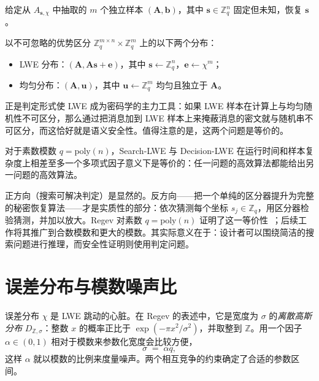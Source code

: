 \begin{definition}
给定从 $A_{\mathbf{s},\chi}$ 中抽取的 $m$ 个独立样本 $(\mathbf{A},\mathbf{b})$，其中 $\mathbf{s}\in\mathbb{Z}_q^{n}$ 固定但未知，恢复 $\mathbf{s}$。
\end{definition}

\begin{definition}
以不可忽略的优势区分 $\mathbb{Z}_q^{m\times n}\times\mathbb{Z}_q^{m}$ 上的以下两个分布：
\begin{itemize}
  \item LWE 分布：$(\mathbf{A},\mathbf{A}\mathbf{s}+\mathbf{e})$，其中 $\mathbf{s}\leftarrow\mathbb{Z}_q^{n}$，$\mathbf{e}\leftarrow\chi^{m}$；
  \item 均匀分布：$(\mathbf{A},\mathbf{u})$，其中 $\mathbf{u}\leftarrow\mathbb{Z}_q^{m}$ 均匀且独立于 $\mathbf{A}$。
\end{itemize}
\end{definition}

正是判定形式使 LWE 成为密码学的主力工具：如果 LWE 样本在计算上与均匀随机性不可区分，那么通过把消息加到 LWE 样本上来掩蔽消息的密文就与随机串不可区分，而这恰好就是语义安全性。值得注意的是，这两个问题是等价的。

\begin{proposition}[搜索与判定的等价性]
\label{prop:search-decision}
对于素数模数 $q=\mathrm{poly}(n)$，Search-LWE 与 Decision-LWE 在运行时间和样本复杂度上相差至多一个多项式因子意义下是等价的：任一问题的高效算法都能给出另一问题的高效算法。
\end{proposition}

正方向（搜索可解决判定）是显然的。反方向——把一个单纯的区分器提升为完整的秘密恢复算法——才是实质性的部分：依次猜测每个坐标 $s_j\in\mathbb{Z}_q$，用区分器检验猜测，并加以放大。Regev 对素数 $q=\mathrm{poly}(n)$ 证明了这一等价性~\cite{regev2009}；后续工作将其推广到合数模数和更大的模数。其实际意义在于：设计者可以围绕简洁的搜索问题进行推理，而安全性证明则使用判定问题。

\section{误差分布与模数噪声比}
\label{sec:lwe-noise}

误差分布 $\chi$ 是 LWE 跳动的心脏。在 Regev 的表述中，它是宽度为 $\sigma$ 的\emph{离散高斯分布} $D_{\mathbb{Z},\sigma}$：整数 $x$ 的概率正比于 $\exp(-\pi x^2/\sigma^2)$，并取整到 $\mathbb{Z}$。用一个因子 $\alpha\in(0,1)$ 相对于模数来参数化宽度会比较方便，
\[
\sigma \;=\; \alpha q,
\]
这样 $\alpha$ 就以模数的比例来度量噪声。两个相互竞争的约束确定了合适的参数区间。

